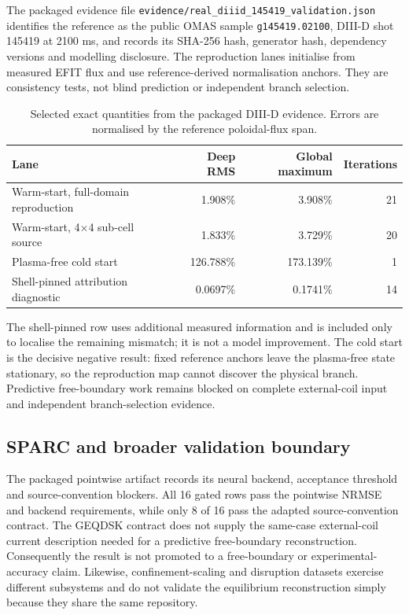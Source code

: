 \documentclass[11pt]{article}
\newcommand{\code}[1]{\texttt{#1}}
\begin{document}
The packaged evidence file
\code{evidence/real\_diiid\_145419\_validation.json} identifies the reference as
the public OMAS sample \code{g145419.02100}, DIII-D shot 145419 at 2100 ms, and
records its SHA-256 hash, generator hash, dependency versions and modelling
disclosure.  The reproduction lanes initialise from measured EFIT flux and use
reference-derived normalisation anchors.  They are consistency tests, not blind
prediction or independent branch selection.

\begin{table}[ht]
\centering
\caption{Selected exact quantities from the packaged DIII-D evidence.  Errors
are normalised by the reference poloidal-flux span.}
\label{tab:diiid}
\begin{tabular}{lrrr}
\toprule
Lane & Deep RMS & Global maximum & Iterations \\
\midrule
Warm-start, full-domain reproduction & 1.908\% & 3.908\% & 21 \\
Warm-start, 4$\times$4 sub-cell source & 1.833\% & 3.729\% & 20 \\
Plasma-free cold start & 126.788\% & 173.139\% & 1 \\
Shell-pinned attribution diagnostic & 0.0697\% & 0.1741\% & 14 \\
\bottomrule
\end{tabular}
\end{table}

The shell-pinned row uses additional measured information and is included only
to localise the remaining mismatch; it is not a model improvement.  The cold
start is the decisive negative result: fixed reference anchors leave the
plasma-free state stationary, so the reproduction map cannot discover the
physical branch.  Predictive free-boundary work remains blocked on complete
external-coil input and independent branch-selection evidence.

\subsection{SPARC and broader validation boundary}

The packaged pointwise artifact records its neural backend, acceptance threshold
and source-convention blockers.  All 16 gated rows pass the pointwise NRMSE and
backend requirements, while only 8 of 16 pass the adapted source-convention
contract.  The GEQDSK contract does not supply the same-case external-coil
current description needed for a predictive free-boundary reconstruction.
Consequently the result is not promoted to a free-boundary or
experimental-accuracy claim.  Likewise,
confinement-scaling and disruption datasets exercise different subsystems and
do not validate the equilibrium reconstruction simply because they share the
same repository.
\end{document}
